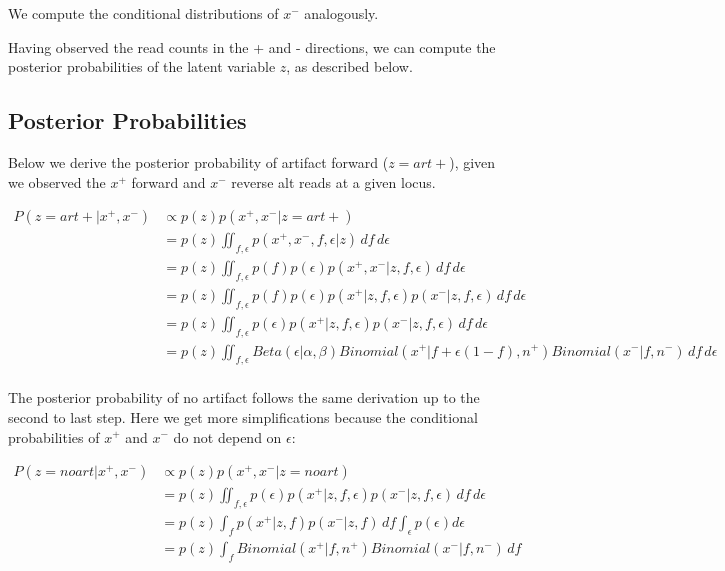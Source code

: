 \documentclass[a4paper]{article}
\begin{document}
We compute the conditional distributions of $x^-$  analogously.

Having observed the read counts in the + and - directions, we can compute the posterior probabilities of the latent variable $z$, as described below.

\subsection{Posterior Probabilities}

Below we derive the posterior probability of artifact forward ($z = art+$), given we observed the $x^+$ forward and $x^-$ reverse alt reads at a given locus.

\begin{equation}
\begin{split}
P(z=art+ |x^+, x^-) & \propto p(z) p(x^+, x^- | z=art+) \\
& = p(z) \iint_{f, \epsilon}  p(x^+, x^-, f, \epsilon | z) \,df\,d\epsilon \\
& = p(z) \iint_{f, \epsilon}  p(f) p(\epsilon) p(x^+, x^- | z, f, \epsilon) \,df\,d\epsilon \\
& = p(z) \iint_{f, \epsilon}  p(f) p(\epsilon) p(x^+ | z, f, \epsilon) p(x^- | z, f, \epsilon) \,df\,d\epsilon \\
& = p(z) \iint_{f, \epsilon}  p(\epsilon) p(x^+ | z, f, \epsilon) p(x^- | z, f, \epsilon) \,df\,d\epsilon \\
& = p(z) \iint_{f, \epsilon}  Beta(\epsilon|\alpha, \beta) Binomial(x^+ | f + \epsilon(1-f), n^+) Binomial(x^- | f, n^-) \,df\,d\epsilon \\
\end{split}
\end{equation}

The posterior probability of no artifact follows the same derivation up to the second to last step. Here we get more simplifications because the conditional probabilities of $x^+$ and $x^-$ do not depend on $\epsilon$:

\begin{equation}
\begin{split}
P(z=noart |x^+, x^-) & \propto p(z) p(x^+, x^- | z=noart) \\
		    & = p(z) \iint_{f, \epsilon}  p(\epsilon) p(x^+ | z, f, \epsilon) p(x^- | z, f, \epsilon) \,df\,d\epsilon \\
		    & = p(z) \int_{f}  p(x^+ | z, f) p(x^- | z, f) \,df \int_{\epsilon}  p(\epsilon) d\epsilon \\
                     & = p(z) \int_{f}  Binomial(x^+ | f, n^+) Binomial(x^- | f, n^-) \,df \\
\end{split}
\end{equation}
\end{document}
